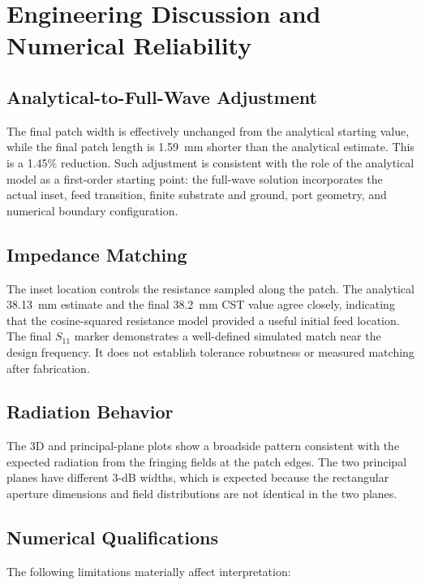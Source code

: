 \section{Engineering Discussion and Numerical Reliability}
\label{sec:engineering-discussion}

\subsection{Analytical-to-Full-Wave Adjustment}

The final patch width is effectively unchanged from the analytical starting value,
while the final patch length is 1.59~mm shorter than the analytical estimate. This is a
1.45\% reduction. Such adjustment is consistent with the role of the analytical model
as a first-order starting point: the full-wave solution incorporates the actual inset,
feed transition, finite substrate and ground, port geometry, and numerical boundary
configuration.

\subsection{Impedance Matching}

The inset location controls the resistance sampled along the patch. The analytical
38.13~mm estimate and the final 38.2~mm CST value agree closely, indicating that the
cosine-squared resistance model provided a useful initial feed location. The final
$S_{11}$ marker demonstrates a well-defined simulated match near the design frequency.
It does not establish tolerance robustness or measured matching after fabrication.

\subsection{Radiation Behavior}

The 3D and principal-plane plots show a broadside pattern consistent with the expected
radiation from the fringing fields at the patch edges. The two principal planes have
different 3-dB widths, which is expected because the rectangular aperture dimensions
and field distributions are not identical in the two planes.

\subsection{Numerical Qualifications}

The following limitations materially affect interpretation:

